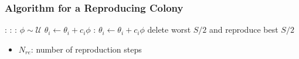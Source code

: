\documentclass{beamer}
\begin{document}
\begin{frame}
\frametitle{Algorithm for a Reproducing Colony}
\begin{algorithmic}[1]
:
  :
    :
      \State $\phi \sim \mathcal{U}$
      \State $\theta_i \gets \theta_i + c_i \phi$
      :
        \State $\theta_i \gets \theta_i + c_i \phi$
      \EndWhile
    \EndFor
  \EndFor
  \State delete worst $S/2$ and reproduce best $S/2$
\EndFor
\end{algorithmic}
\begin{itemize}
  \item $N_{re}$: number of reproduction steps
\end{itemize}
\end{frame}

\end{document}
